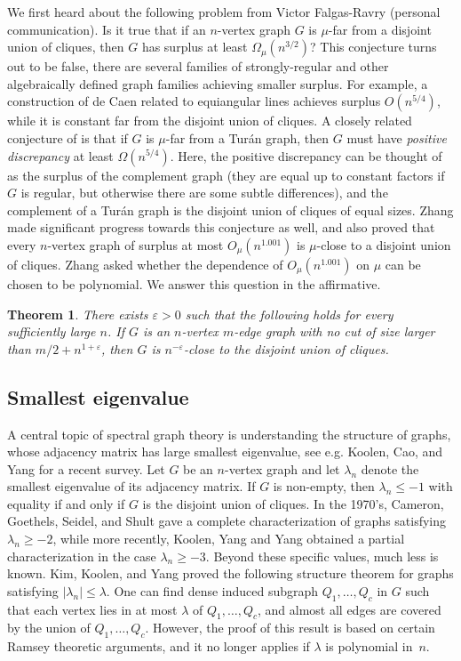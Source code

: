 \documentclass[11pt]{article}
\theoremstyle{plain}
\newtheorem{theorem}{Theorem}[section]
\theoremstyle{definition}
\newcommand{\eps}{\varepsilon}
\begin{document}
We first heard about the following problem from Victor Falgas-Ravry (personal communication). Is it true that if an $n$-vertex graph $G$ is $\mu$-far from a disjoint union of cliques, then $G$ has surplus at least $\Omega_{\mu}(n^{3/2})$? This conjecture turns out to be false, there are several families of strongly-regular and other algebraically defined graph families achieving smaller surplus. For example, a construction of de Caen \cite{caen} related to equiangular lines achieves surplus $O(n^{5/4})$, while it is constant far from the disjoint union of cliques. A closely related conjecture of \cite{RST} is that if $G$ is $\mu$-far from a Tur\'an graph, then $G$ must have \emph{positive discrepancy} at least $\Omega(n^{5/4})$. Here, the positive discrepancy can be thought of as the surplus of the complement graph (they are equal up to constant factors if $G$ is regular, but otherwise there are some subtle differences), and the complement of a Tur\'an graph is the disjoint union of cliques of equal sizes. Zhang \cite{Zhang} made significant progress towards this conjecture as well, and also proved that every $n$-vertex graph of surplus at most $O_{\mu}(n^{1.001})$ is $\mu$-close to a disjoint union of cliques. Zhang asked whether the dependence of $O_{\mu}(n^{1.001})$ on $\mu$ can be chosen to be polynomial. We answer this question in the affirmative.

\begin{theorem}\label{thm:stability}
There exists $\eps>0$ such that the following holds for every sufficiently large $n$. If $G$ is an $n$-vertex $m$-edge graph with no cut of size larger than $m/2+n^{1+\eps}$, then $G$ is $n^{-\eps}$-close to the disjoint union of cliques.
\end{theorem}

\subsection{Smallest eigenvalue}

A central topic of spectral graph theory is understanding the structure of graphs, whose adjacency matrix has large smallest eigenvalue, see e.g. Koolen, Cao, and Yang \cite{KCY} for a recent survey. Let $G$ be an $n$-vertex graph and let $\lambda_n$ denote the smallest eigenvalue of its adjacency matrix. If $G$ is non-empty, then $\lambda_n\leq -1$ with equality if and only if $G$ is the disjoint union of cliques.  In the 1970's,  Cameron, Goethels, Seidel, and Shult \cite{CGSS}
gave a complete characterization of graphs satisfying  $\lambda_n\geq -2$,  while more recently,
Koolen, Yang and Yang \cite{KYY} obtained a partial characterization in the case $\lambda_n\geq -3$. Beyond these specific values, much less is known. Kim, Koolen, and Yang \cite{KKY} proved the following structure theorem for graphs satisfying $|\lambda_n|\leq \lambda$. One can find dense induced subgraph $Q_1,\dots,Q_c$ in $G$ such that each vertex lies in at most $\lambda$ of $Q_1,\dots,Q_c$, and almost all edges are covered by the union of $Q_1,\dots,Q_c$. However, the proof of this result is based on certain Ramsey theoretic arguments, and it no longer applies if $\lambda$ is polynomial in~$n$.
\end{document}
